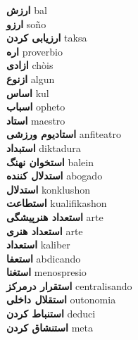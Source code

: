 \textbf{ ارزش  } bal \\
\textbf{ ارزو  } soño \\
\textbf{ ارزیابی کردن  } taksa \\
\textbf{ اره  } proverbio \\
\textbf{ ازادی  } chòis \\
\textbf{ ازنوع  } algun \\
\textbf{ اساس  } kul \\
\textbf{ اسباب  } opheto \\
\textbf{ استاد  } maestro \\
\textbf{ استادیوم ورزشی  } anfiteatro \\
\textbf{ استبداد  } diktadura \\
\textbf{ استخوان نهنگ  } balein \\
\textbf{ استدلال کننده  } abogado \\
\textbf{ استدلال  } konklushon \\
\textbf{ استطاعت  } kualifikashon \\
\textbf{ استعداد هنرپیشگی  } arte \\
\textbf{ استعداد هنری  } arte \\
\textbf{ استعداد  } kaliber \\
\textbf{ استعفا  } abdicando \\
\textbf{ استغنا  } menospresio \\
\textbf{ استقرار درمرکز  } centralisando \\
\textbf{ استقلال داخلی  } outonomia \\
\textbf{ استنباط کردن  } deduci \\
\textbf{ استنشاق کردن  } meta \\

